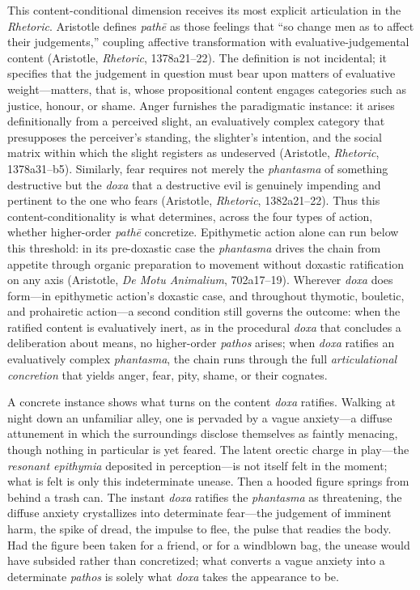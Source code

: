 This content-conditional dimension receives its most explicit articulation in the \textit{Rhetoric}. Aristotle defines \textit{pathē} as those feelings that ``so change men as to affect their judgements,'' coupling affective transformation with evaluative-judgemental content (Aristotle, \textit{Rhetoric}, 1378a21--22). The definition is not incidental; it specifies that the judgement in question must bear upon matters of evaluative weight---matters, that is, whose propositional content engages categories such as justice, honour, or shame. Anger furnishes the paradigmatic instance: it arises definitionally from a perceived slight, an evaluatively complex category that presupposes the perceiver's standing, the slighter's intention, and the social matrix within which the slight registers as undeserved (Aristotle, \textit{Rhetoric}, 1378a31--b5). Similarly, fear requires not merely the \textit{phantasma} of something destructive but the \textit{doxa} that a destructive evil is genuinely impending and pertinent to the one who fears (Aristotle, \textit{Rhetoric}, 1382a21--22). Thus this content-conditionality is what determines, across the four types of action, whether higher-order \textit{pathē} concretize. Epithymetic action alone can run below this threshold: in its pre-doxastic case the \textit{phantasma} drives the chain from appetite through organic preparation to movement without doxastic ratification on any axis (Aristotle, \textit{De Motu Animalium}, 702a17--19). Wherever \textit{doxa} does form---in epithymetic action's doxastic case, and throughout thymotic, bouletic, and prohairetic action---a second condition still governs the outcome: when the ratified content is evaluatively inert, as in the procedural \textit{doxa} that concludes a deliberation about means, no higher-order \textit{pathos} arises; when \textit{doxa} ratifies an evaluatively complex \textit{phantasma}, the chain runs through the full \textit{articulational concretion} that yields anger, fear, pity, shame, or their cognates.

A concrete instance shows what turns on the content \textit{doxa} ratifies. Walking at night down an unfamiliar alley, one is pervaded by a vague anxiety---a diffuse attunement in which the surroundings disclose themselves as faintly menacing, though nothing in particular is yet feared. The latent orectic charge in play---the \textit{resonant epithymia} deposited in perception---is not itself felt in the moment; what is felt is only this indeterminate unease. Then a hooded figure springs from behind a trash can. The instant \textit{doxa} ratifies the \textit{phantasma} as threatening, the diffuse anxiety crystallizes into determinate fear---the judgement of imminent harm, the spike of dread, the impulse to flee, the pulse that readies the body. Had the figure been taken for a friend, or for a windblown bag, the unease would have subsided rather than concretized; what converts a vague anxiety into a determinate \textit{pathos} is solely what \textit{doxa} takes the appearance to be.

